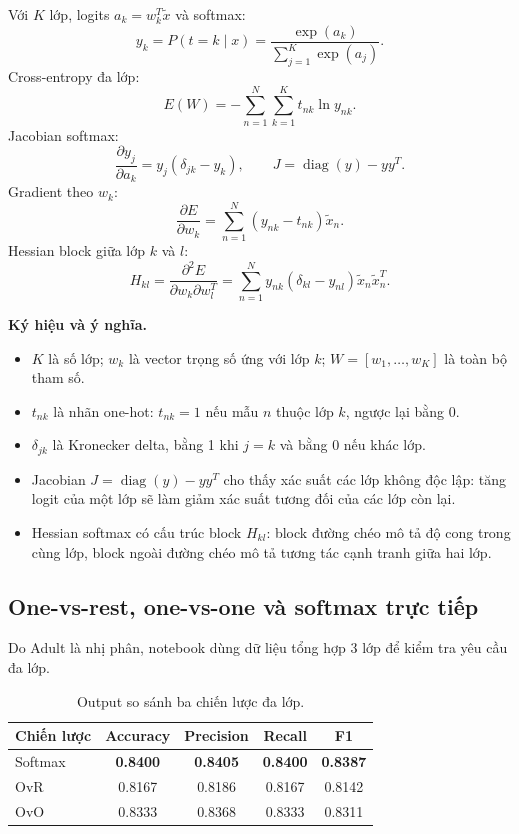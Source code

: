\documentclass[12pt,a4paper]{article}
\begin{document}
Với $K$ lớp, logits $a_k=w_k^T\tilde{x}$ và softmax:
\begin{equation}
 y_k=P(t=k\mid x)=\frac{\exp(a_k)}{\sum_{j=1}^{K}\exp(a_j)}.
\end{equation}
Cross-entropy đa lớp:
\begin{equation}
 E(W)=-\sum_{n=1}^{N}\sum_{k=1}^{K}t_{nk}\ln y_{nk}.
\end{equation}
Jacobian softmax:
\begin{equation}
 \frac{\partial y_j}{\partial a_k}=y_j(\delta_{jk}-y_k), \qquad J=\operatorname{diag}(y)-yy^T.
\end{equation}
Gradient theo $w_k$:
\begin{equation}
 \frac{\partial E}{\partial w_k}=\sum_{n=1}^{N}(y_{nk}-t_{nk})\tilde{x}_n.
\end{equation}
Hessian block giữa lớp $k$ và $l$:
\begin{equation}
 H_{kl}=\frac{\partial^2E}{\partial w_k\partial w_l^T}=\sum_{n=1}^{N}y_{nk}(\delta_{kl}-y_{nl})\tilde{x}_n\tilde{x}_n^T.
\end{equation}

\textbf{Ký hiệu và ý nghĩa.}
\begin{itemize}
  \item $K$ là số lớp; $w_k$ là vector trọng số ứng với lớp $k$; $W=[w_1,\ldots,w_K]$ là toàn bộ tham số.
  \item $t_{nk}$ là nhãn one-hot: $t_{nk}=1$ nếu mẫu $n$ thuộc lớp $k$, ngược lại bằng 0.
  \item $\delta_{jk}$ là Kronecker delta, bằng 1 khi $j=k$ và bằng 0 nếu khác lớp.
  \item Jacobian $J=\operatorname{diag}(y)-yy^T$ cho thấy xác suất các lớp không độc lập: tăng logit của một lớp sẽ làm giảm xác suất tương đối của các lớp còn lại.
  \item Hessian softmax có cấu trúc block $H_{kl}$: block đường chéo mô tả độ cong trong cùng lớp, block ngoài đường chéo mô tả tương tác cạnh tranh giữa hai lớp.
\end{itemize}

\subsection{One-vs-rest, one-vs-one và softmax trực tiếp}

Do Adult là nhị phân, notebook dùng dữ liệu tổng hợp 3 lớp để kiểm tra yêu cầu đa lớp.

\begin{table}[htbp]
\centering
\caption{Output so sánh ba chiến lược đa lớp.}
\begin{tabular}{lcccc}
\toprule
\textbf{Chiến lược} & \textbf{Accuracy} & \textbf{Precision} & \textbf{Recall} & \textbf{F1} \\
\midrule
Softmax & \textbf{0.8400} & \textbf{0.8405} & \textbf{0.8400} & \textbf{0.8387} \\
OvR & 0.8167 & 0.8186 & 0.8167 & 0.8142 \\
OvO & 0.8333 & 0.8368 & 0.8333 & 0.8311 \\
\bottomrule
\end{tabular}
\end{table}
\end{document}
